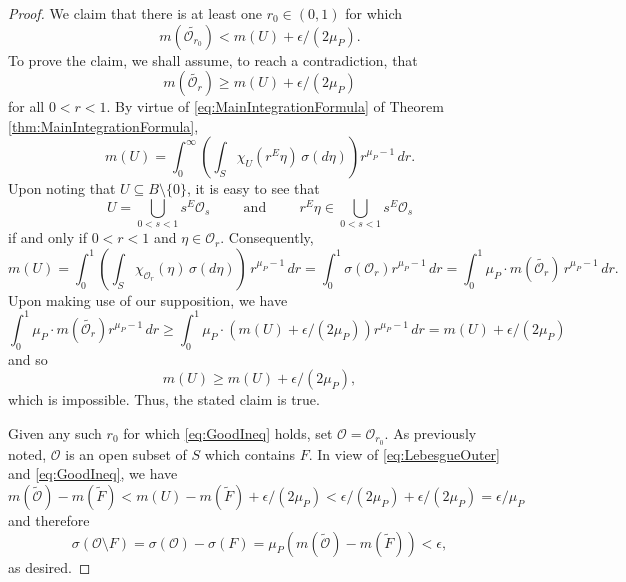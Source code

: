 \documentclass[11pt, letter]{book}
\begin{document}
\begin{proof}
We claim that there is at least one $r_0\in (0,1)$ for which 
\begin{equation}\label{eq:GoodIneq}
m(\widetilde{\mathcal{O}_{r_0}})< m(U)+\epsilon/(2\mu_P).
\end{equation}
To prove the claim, we shall assume, to reach a contradiction, that 
\begin{equation*}
m(\widetilde{\mathcal{O}_{r}})\geq m(U)+\epsilon/(2\mu_P)
\end{equation*}
for all $0<r<1$. By virtue of \eqref{eq:MainIntegrationFormula} of Theorem \ref{thm:MainIntegrationFormula},
\begin{equation*}
m(U)=\int_{0}^\infty\left(\int_S \chi_{U}(r^E\eta)\,\sigma(d\eta)\right)r^{\mu_P-1}\,dr.
\end{equation*}
Upon noting that $U\subseteq B\setminus\{0\}$, it is easy to see that
\begin{equation*}
U=\bigcup_{0<s<1}s^E\mathcal{O}_s
\hspace{1cm}\mbox{and}\hspace{1cm}
r^E\eta\in \bigcup_{0<s<1}s^E\mathcal{O}_s
\end{equation*}
if and only if $0<r<1$ and $\eta\in \mathcal{O}_r$. Consequently,
\begin{equation*}
m(U)=\int_0^1\left(\int_S\chi_{\mathcal{O}_r}(\eta)\,\sigma(d\eta)\right)\,r^{\mu_P-1}\,dr=\int_0^1\sigma(\mathcal{O}_r)r^{\mu_P-1}\,dr=\int_0^1 \mu_P\cdot m(\widetilde{\mathcal{O}_r})\,r^{\mu_P-1}\,dr.
\end{equation*}
Upon making use of our supposition, we have
\begin{equation*}
\int_0^1\mu_P\cdot m(\widetilde{\mathcal{O}_r})r^{\mu_P-1}\,dr\geq \int_0^1\mu_P\cdot (m(U)+\epsilon/(2\mu_P))r^{\mu_P-1}\,dr=m(U)+\epsilon/(2\mu_P)
\end{equation*}
and so
\begin{equation*}
m(U)\geq m(U)+\epsilon/(2\mu_P),
\end{equation*}
which is impossible. Thus, the stated claim is true.

Given any such $r_0$ for which \eqref{eq:GoodIneq} holds, set $\mathcal{O}=\mathcal{O}_{r_0}$. As previously noted, $\mathcal{O}$ is an open subset of $S$ which contains $F$. In view of \eqref{eq:LebesgueOuter} and \eqref{eq:GoodIneq}, we have
\begin{equation*}
m(\widetilde{\mathcal{O}})-m(\widetilde{F})<m(U)-m(\widetilde{F})+\epsilon/(2\mu_P)<\epsilon/(2\mu_P)+\epsilon/(2\mu_P)=\epsilon/\mu_P
\end{equation*}
and therefore
\begin{equation*}
\sigma(\mathcal{O}\setminus F)=\sigma(\mathcal{O})-\sigma(F)=\mu_P(m(\widetilde{\mathcal{O}})-m(\widetilde{F}))<\epsilon,
\end{equation*}
as desired.
\end{proof}
\end{document}
